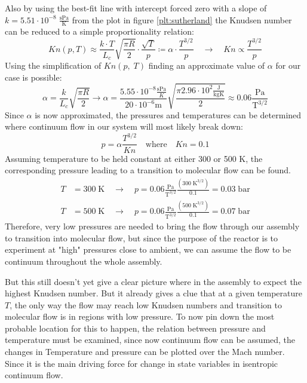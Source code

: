 	Also by using the best-fit line with intercept forced zero with a slope of $k = 5.51 \cdot 10^{-8} \; \frac{\text{sPa}}{\text{K}}$ from the plot in figure \ref{plt:sutherland} the Knudsen number can be reduced to a simple proportionality relation:
	$$
		Kn(p,T) \approx
		\frac{ k \cdot T }{ L_c } \sqrt{ \frac{ \pi R}{ 2 } } \cdot \frac{ \sqrt{ T }}{ p }
		\coloneqq \alpha \cdot \frac{ T^{ 3/2 } }{ p }
		\quad \rightarrow \quad
		Kn \propto \frac{ T^{ 3/2 } }{ p }
	$$
	Using the simplification of $Kn(p,\;T)$ finding an approximate value of $\alpha$ for our case is possible:
	$$
		\alpha = \frac{k}{L_c}\sqrt{\frac{\pi R}{2}}
		\to \alpha = \frac{5.55\cdot 10^{-8} \frac{\text{sPa}}{K}}{20\cdot10^{-6}\text{m}}\sqrt{\frac{\pi 2.96\cdot 10^{2} \frac{\text{J}}{\text{kgK}}}{2}}
		\approx 0.06 \frac{\text{Pa}}{\text{T}^{3/2}}
	$$
	Since $\alpha$ is now approximated, the pressures and temperatures can be determined where continuum flow in our system will most likely break down:
	$$
		p = \alpha \frac{T^{3/2}}{Kn} \quad \text{where} \quad Kn = 0.1
	$$
	Assuming temperature to be held constant at either 300 or 500 K, the corresponding pressure leading to a transition to molecular flow can be found.
	\begin{align*}
		T &= 300\;\text{K}\quad\to\quad p = 0.06\frac{\text{Pa}}{\text{T}^{3/2}} \frac{(300\;\text{K}^{3/2})}{0.1} = 0.03\;\text{bar}\\
		T &= 500\;\text{K}\quad\to\quad p = 0.06\frac{\text{Pa}}{\text{T}^{3/2}} \frac{(500\;\text{K}^{3/2})}{0.1} = 0.07\;\text{bar}
 	\end{align*}
	Therefore, very low pressures are needed to bring the flow through our assembly to transition into molecular flow, but since the purpose of the reactor is to experiment at "high" pressures close to ambient, we can assume the flow to be continuum throughout the whole assembly.
	
	But this still doesn't yet give a clear picture where in the assembly to expect the highest Knudsen number.
	But it already gives a clue that at a given temperature $T$, the only way the flow may reach low Knudsen numbers and transition to molecular flow is in regions with low pressure.
	To now pin down the most probable location for this to happen, the relation between pressure and temperature must be examined, since now continuum flow can be assumed, the changes in Temperature and pressure can be plotted over the Mach number.
	Since it is the main driving force for change in state variables in isentropic continuum flow.

